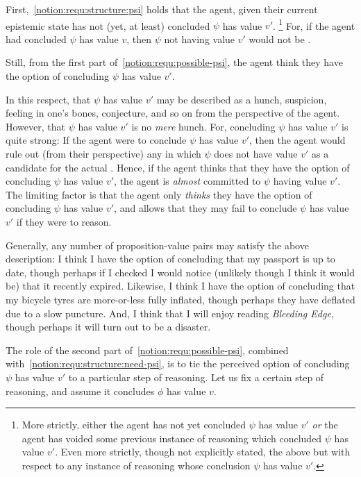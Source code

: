 \begin{note}[\ref{notion:requ:structure:psi}]
  First,~\ref{notion:requ:structure:psi} holds that the agent, given their current epistemic state has not (yet, at least) concluded \(\psi\) has value \(v'\).\nolinebreak
  \footnote{
    More strictly, either the agent has not yet concluded \(\psi\) has value \(v'\) \emph{or} the agent has voided some previous instance of reasoning which concluded \(\psi\) has value \(v'\).
    Even more strictly, though not explicitly stated, the above but with respect to any instance of reasoning whose conclusion \indicateV{} \(\psi\) has value \(v'\).
  }
  For, if the agent had concluded \(\psi\) has value \(v\), then \(\psi\) not having value \(v'\) would not be \epVAd{}.

  Still, from the first part of~\ref{notion:requ:possible-psi}, the agent think they have the option of concluding \(\psi\) has value \(v'\).

  In this respect, that \(\psi\) has value \(v'\) may be described as a hunch, suspicion, feeling in one's bones, conjecture, and so on from the perspective of the agent.
  However, that \(\psi\) has value \(v'\) is no \emph{mere} hunch.
  For, concluding \(\psi\) has value \(v'\) is quite strong:
  If the agent were to conclude \(\psi\) has value \(v'\), then the agent would rule out (from their perspective) any \world{} in which \(\psi\) does not have value \(v'\) as a candidate for the actual \world{}.
  Hence, if the agent thinks that they have the option of concluding \(\psi\) has value \(v'\), the agent is \emph{almost} committed to \(\psi\) having value \(v'\).
  The limiting factor is that the agent only \emph{thinks} they have the option of concluding \(\psi\) has value \(v'\), and allows that they may fail to conclude \(\psi\) has value \(v'\) if they were to reason.

  Generally, any number of proposition-value pairs may satisfy the above description:
  I think I have the option of concluding that my passport is up to date, though perhaps if I checked I would notice (unlikely though I think it would be) that it recently expired.
  Likewise, I think I have the option of concluding that my bicycle tyres are more-or-less fully inflated, though perhaps they have deflated due to a slow puncture.
  And, I think that I will enjoy reading \emph{Bleeding Edge}, though perhaps it will turn out to be a disaster.

  The role of the second part of~\ref{notion:requ:possible-psi}, combined with~\ref{notion:requ:structure:need-psi}, is to tie the perceived option of concluding \(\psi\) has value \(v'\) to a particular step of reasoning.
  Let us fix a certain step of reasoning, and assume it concludes \(\phi\) has value \(v\).


\end{note}
